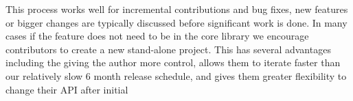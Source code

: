 \documentclass[12pt]{article}
\numberwithin{page}{section}
\begin{document}
This process works well for incremental contributions and bug fixes,
new features or bigger changes are typically discussed before
significant work is done.  In many cases if the feature does not need
to be in the core library we encourage contributors to create a new
stand-alone project.  This has several advantages including the giving
the author more control, allows them to iterate faster than our
relatively slow 6 month release schedule, and gives them greater
flexibility to change their API after initial


\newpage

\def\ref@jnl#1{{\rm#1}}

\def\aj{\ref@jnl{AJ}}                   %
\def\actaa{\ref@jnl{Acta Astron.}}      %
\def\araa{\ref@jnl{ARA\&A}}             %
\def\apj{\ref@jnl{ApJ}}                 %
\def\apjl{\ref@jnl{ApJ}}                %
\def\apjs{\ref@jnl{ApJS}}               %
\def\ao{\ref@jnl{Appl.~Opt.}}           %
\def\apss{\ref@jnl{Ap\&SS}}             %
\def\aap{\ref@jnl{A\&A}}                %
\def\aapr{\ref@jnl{A\&A~Rev.}}          %
\def\aaps{\ref@jnl{A\&AS}}              %
\def\azh{\ref@jnl{AZh}}                 %
\def\baas{\ref@jnl{BAAS}}               %
\def\bac{\ref@jnl{Bull. astr. Inst. Czechosl.}}
\def\caa{\ref@jnl{Chinese Astron. Astrophys.}}
\def\cjaa{\ref@jnl{Chinese J. Astron. Astrophys.}}
\def\icarus{\ref@jnl{Icarus}}           %
\def\jcap{\ref@jnl{J. Cosmology Astropart. Phys.}}
\def\jrasc{\ref@jnl{JRASC}}             %
\def\memras{\ref@jnl{MmRAS}}            %
\def\mnras{\ref@jnl{MNRAS}}             %
\def\na{\ref@jnl{New A}}                %
\def\nar{\ref@jnl{New A Rev.}}          %
\def\pra{\ref@jnl{Phys.~Rev.~A}}        %
\def\prb{\ref@jnl{Phys.~Rev.~B}}        %
\end{document}
